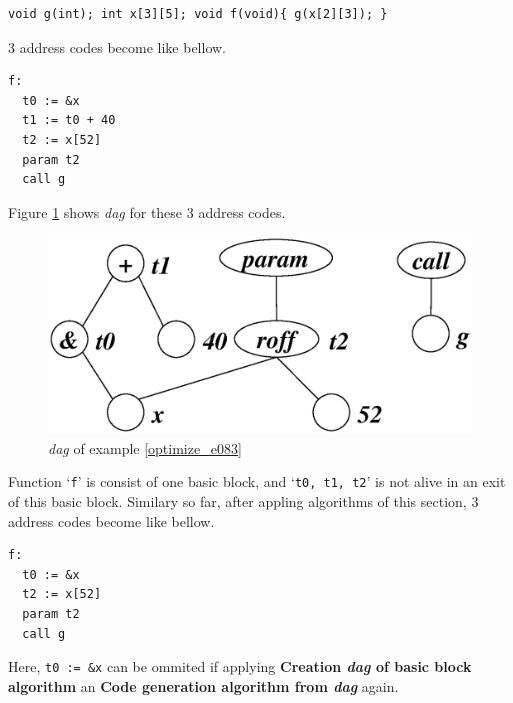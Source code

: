 \begin{Example}
\label{optimize_e083}
\begin{verbatim}
void g(int); int x[3][5]; void f(void){ g(x[2][3]); }
\end{verbatim}
3 address codes become like bellow.
\begin{verbatim}
f:
  t0 := &x
  t1 := t0 + 40
  t2 := x[52]
  param t2
  call g
\end{verbatim}
Figure \ref{optimize_e084} shows {\em dag} for these 3 address codes.
\begin{figure}[htbp]
\begin{center}
\includegraphics[width=1.0\linewidth,height=0.509\linewidth]{opt035.eps}
\caption{{\em dag} of example \ref{optimize_e083}}
\label{optimize_e084}
\end{center}
\end{figure}
Function `{\tt{f}}' is consist of one basic block,
and `{\tt{t0, t1, t2}}' is not alive in an exit of this basic block.
Similary so far, 
after appling algorithms of this section,
3 address codes become like bellow.
\begin{verbatim}
f:
  t0 := &x
  t2 := x[52]
  param t2
  call g
\end{verbatim}
Here, {\tt{t0 := \&x}} can be ommited if 
applying {\bf Creation {\em dag} of basic block algorithm} an
{\bf Code generation algorithm from {\em dag}} again.
\end{Example}

